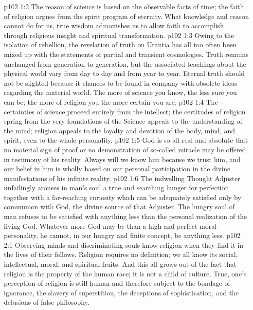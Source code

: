 \vs p102 1:2 The reason of science is based on the observable facts of time; the faith of religion argues from the spirit program of eternity. What knowledge and reason cannot do for us, true wisdom admonishes us to allow faith to accomplish through religious insight and spiritual transformation.
\vs p102 1:3 Owing to the isolation of rebellion, the revelation of truth on Urantia has all too often been mixed up with the statements of partial and transient cosmologies. Truth remains unchanged from generation to generation, but the associated teachings about the physical world vary from day to day and from year to year. Eternal truth should not be slighted because it chances to be found in company with obsolete ideas regarding the material world. The more of science you know, the less sure you can be; the more of religion you  the more certain you are.
\vs p102 1:4 The certainties of science proceed entirely from the intellect; the certitudes of religion spring from the very foundations of the  Science appeals to the understanding of the mind; religion appeals to the loyalty and devotion of the body, mind, and spirit, even to the whole personality.\plusone
\pc \vs p102 1:5 God is so all real and absolute that no material sign of proof or no demonstration of so\hyp{}called miracle may be offered in testimony of his reality. Always will we know him because we trust him, and our belief in him is wholly based on our personal participation in the divine manifestations of his infinite reality.
\pc \vs p102 1:6 The indwelling Thought Adjuster unfailingly arouses in man’s soul a true and searching hunger for perfection together with a far\hyp{}reaching curiosity which can be adequately satisfied only by communion with God, the divine source of that Adjuster. The hungry soul of man refuses to be satisfied with anything less than the personal realization of the living God. Whatever more God may be than a high and perfect moral personality, he cannot, in our hungry and finite concept, be anything less.
\vs p102 2:1 Observing minds and discriminating souls know religion when they find it in the lives of their fellows. Religion requires no definition; we all know its social, intellectual, moral, and spiritual fruits. And this all grows out of the fact that religion is the property of the human race; it is not a child of culture. True, one’s perception of religion is still human and therefore subject to the bondage of ignorance, the slavery of superstition, the deceptions of sophistication, and the delusions of false philosophy.
